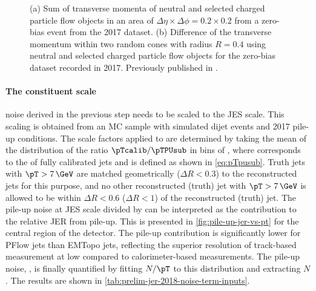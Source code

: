 
\begin{figure}[t]
    \caption{(a) Sum of transverse momenta of neutral and selected charged particle flow objects in an area of $\Delta \eta \times \Delta \phi = 0.2 \times 0.2$ from a zero-bias event from the 2017 dataset. (b) Difference of the transverse momentum within two random cones with radius $R = 0.4$ using neutral and selected charged particle flow objects for the zero-bias dataset recorded in 2017.
        Previously published in .}
    \label{fig:random-cones-balance}
\end{figure}

\paragraph{The constituent scale} noise derived in the previous step needs to be scaled to the JES scale.
This scaling is obtained from an MC sample with simulated dijet events and 2017 pile-up conditions. The scale factors applied to \Npileupconstscale are determined by taking the mean of the distribution of the ratio $\pTcalib / \pTPUsub$ in bins of \pTtruth, where \pTcalib corresponds to the \pT of fully calibrated jets and \pTPUsub is defined as shown in \cref{eq:pTpusub}. Truth jets with $\pT > 7\,\GeV$ are matched geometrically ($\Delta R < 0.3$) to the reconstructed jets for this purpose, and no other reconstructed (truth) jet with $\pT > 7\,\GeV$ is allowed to be within $\Delta R < 0.6$ ($\Delta R < 1$) of the reconstructed (truth) jet.
The pile-up noise at JES scale divided by \pTtruth can be interpreted as the contribution to the relative JER from pile-up. This is presented in \cref{fig:pile-up-jer-vs-pt} for the central region of the detector.
The pile-up contribution is significantly lower for PFlow jets than EMTopo jets, reflecting the superior resolution of track-based measurement at low \pT compared to calorimeter-based measurements.
The pile-up noise, \Npileup, is finally quantified by fitting $N/\pT$ to this distribution and extracting $N$. The results are shown in \cref{tab:prelim-jer-2018-noise-term-inputs}.


